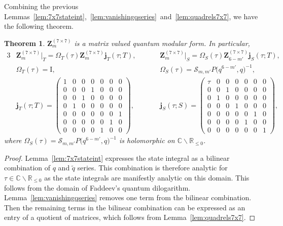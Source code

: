 \documentclass[pdftex]{sigma}
\numberwithin{equation}{section}
\newtheorem{Theorem}{Theorem}[section]
\def\BR{\mathbb{R}}
\def\BC{\mathbb{C}}
\def\tq{\tilde{q}}
\def\ms{\mathbf{j}}
\def\Om{\Omega}
\def\BR{\mathbb R}
\def\BC{\mathbb C}
\def\calS{\mathcal S}
\def\tq{\tilde{q}}
\def\Om{\Omega}
\begin{document}
Combining the previous Lemmas~\ref{lem:7x7stateint},~\ref{lem:vanishingqseries}~and~\ref{lem:quadrels7x7}, we have the following theorem.
\begin{Theorem}\label{thm:7x7qser}
$\mathbf{Z}_{m}^{(7\times 7)}$ is a matrix valued quantum modular form. In particular,
\begin{alignat*}{3}
 &\mathbf{Z}_{m}^{(7\times 7)}\bigl|_{T}
  =
 \Om_{T}(\tau)\mathbf{Z}_{m}^{(7\times 7)}\ms_{T}(\tau;T) ,\quad
 &&\mathbf{Z}_{m}^{(7\times 7)}\bigl|_{S}
  =
 \Om_{S}(\tau)
 \mathbf{Z}_{6-m'}^{(7\times 7)}
 \ms_{S}(\tau;T) ,&\\
 &\Om_{T}(\tau) =\mathrm{I} ,\quad
 &&\Om_{S}(\tau) =\calS_{m,m'}P\bigl(q^{6-m'},q\bigr)^{-1} ,&\\
 &\ms_{T}(\tau;T)
  =
 \begin{pmatrix}
 1 & 0 & 0 & 0 & 0 & 0 & 0\\
 0 & 0 & 0 & 1 & 0 & 0 & 0\\
 0 & 0 & 1 & 0 & 0 & 0 & 0\\
 0 & 1 & 0 & 0 & 0 & 0 & 0\\
 0 & 0 & 0 & 0 & 0 & 0 & 1\\
 0 & 0 & 0 & 0 & 0 & 1 & 0\\
 0 & 0 & 0 & 0 & 1 & 0 & 0
 \end{pmatrix} ,\qquad
 &&\ms_{S}(\tau;S)
  =
 \begin{pmatrix}
 \tau & 0 & 0 & 0 & 0 & 0 & 0\\
 0 & 0 & 1 & 0 & 0 & 0 & 0\\
 0 & 1 & 0 & 0 & 0 & 0 & 0\\
 0 & 0 & 0 & 1 & 0 & 0 & 0\\
 0 & 0 & 0 & 0 & 0 & 1 & 0\\
 0 & 0 & 0 & 0 & 1 & 0 & 0\\
 0 & 0 & 0 & 0 & 0 & 0 & 1
 \end{pmatrix}, &
\end{alignat*}
where $\Om_S(\tau)=\calS_{m,m'}P\bigl(q^{6-m'},q\bigr)^{-1}$ is holomorphic on $\BC\smallsetminus\BR_{\leq0}$.
\end{Theorem}
\begin{proof}
Lemma~\ref{lem:7x7stateint} expresses the state integral as a bilinear combination of $q$ and $\tq$ series. This combination is therefore analytic for $\tau\in\BC\smallsetminus \BR_{\leq0}$ as the state integrals are manifestly analytic on this domain. This follows from the domain of Faddeev's quantum dilogarithm. Lemma~\ref{lem:vanishingqseries} removes one term from the bilinear combination. Then the remaining terms in the bilinear combination can be expressed as an entry of a quotient of matrices, which follows from Lemma~\ref{lem:quadrels7x7}.
\end{proof}
\end{document}
